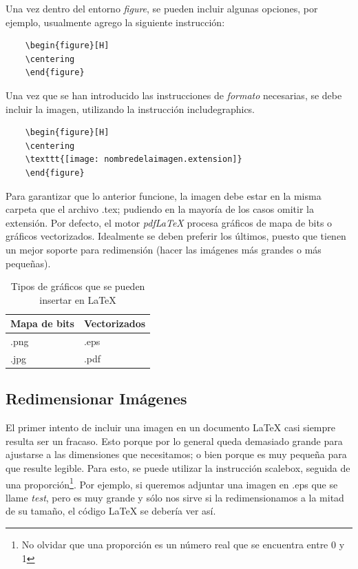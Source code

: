\documentclass[letterpaper,11pt]{article}
\begin{document}
Una vez dentro del entorno \emph{figure}, se pueden incluir algunas opciones, por ejemplo, usualmente agrego la siguiente instrucción:
\begin{lstlisting}
	\begin{figure}[H]
	\centering 
	\end{figure}
\end{lstlisting}

Una vez que se han introducido las instrucciones de \emph{formato} necesarias, se debe incluir la imagen, utilizando la instrucción {\ttfamily includegraphics}.

\begin{lstlisting}
	\begin{figure}[H]
	\centering
	\texttt{[image: nombredelaimagen.extension]}	
	\end{figure}
\end{lstlisting}

Para garantizar que lo anterior funcione, la imagen debe estar en la misma carpeta que el archivo .tex; pudiendo en la mayoría de los casos omitir la extensión. Por defecto, el motor \emph{pdfLaTeX} procesa gráficos de mapa de bits o gráficos vectorizados. Idealmente se deben preferir los últimos, puesto que tienen un mejor soporte para redimensión (hacer las imágenes más grandes o más pequeñas).

\begin{table}[H]
	\centering
	\caption{Tipos de gráficos que se pueden insertar en \LaTeX{}}
	\begin{tabular}{ll}
	\hline \hline
	Mapa de bits		& Vectorizados\\
	\hline
	.png			& .eps	\\
	.jpg			& .pdf  \\
	\hline \hline 
	\end{tabular}
\end{table}


\subsection{Redimensionar Imágenes}

El primer intento de incluir una imagen en un documento \LaTeX{} casi siempre resulta ser un fracaso. Esto porque por lo general queda demasiado grande para ajustarse a las dimensiones que necesitamos; o bien porque es muy pequeña para que resulte legible. Para esto, se puede utilizar la instrucción {\ttfamily scalebox}, seguida de una proporción\footnote{No olvidar que una proporción es un número real que se encuentra entre 0 y 1}. Por ejemplo, si queremos adjuntar una imagen en .eps que se llame \emph{test}, pero es muy grande y sólo nos sirve si la redimensionamos a la mitad de su tamaño, el código \LaTeX{} se debería ver así.
\end{document}
